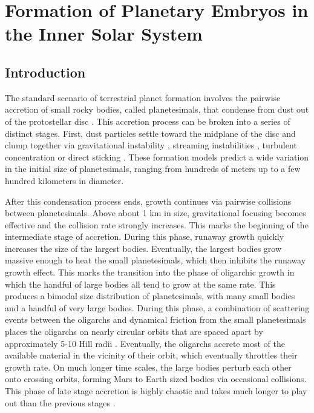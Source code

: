 \chapter {Formation of Planetary Embryos in the Inner Solar System}\label{ch:plSS}

\section{Introduction} \label{sec:intro}

The standard scenario of terrestrial planet formation involves the pairwise accretion of small rocky bodies, called planetesimals, 
that condense from dust out of the protostellar disc \cite{safronov69}. This accretion process can be broken into a series of 
distinct stages. First, dust particles settle toward the midplane of the disc and clump together via gravitational instability 
\cite{goldreich73, youdin02}, streaming instabilities \cite{johansen07, johansen15}, turbulent concentration 
\cite{chambers10, cuzzi08, cuzzi10, hopkins16} or direct sticking \cite{okuzumi12, windmark12, garaud13, katoka13}. These 
formation models predict a wide variation in the initial size of planetesimals, ranging from hundreds of meters up to a few 
hundred kilometers in diameter.

After this condensation process ends, growth continues via pairwise collisions between planetesimals. Above about 1 km in size, 
gravitational focusing becomes effective and the collision rate strongly increases. This marks the beginning of the intermediate 
stage of accretion. During this phase, runaway growth \cite{duncan89, kokubo96, barnes09} quickly increases the size of the 
largest bodies. Eventually, the largest bodies grow massive enough to heat the small planetesimals, which then inhibits the 
runaway growth effect. This marks the transition into the phase of oligarchic growth in which the handful of large bodies all tend 
to grow at the same rate. This produces a bimodal size distribution of planetesimals, with many small bodies and a handful of 
very large bodies. During this phase, a combination of scattering events between the oligarchs and dynamical friction from the 
small planetesimals places the oligarchs on nearly circular orbits that are spaced apart by approximately 5-10 Hill radii 
\cite{kokubo98}. Eventually, the oligarchs accrete most of the available material in the vicinity of their orbit, which eventually 
throttles their growth rate. On much longer time scales, the large bodies perturb each other onto crossing orbits, forming Mars to 
Earth sized bodies via occasional collisions. This phase of late stage accretion is highly chaotic and takes much longer to play 
out than the previous stages \cite{chambers98, raymond06}.

